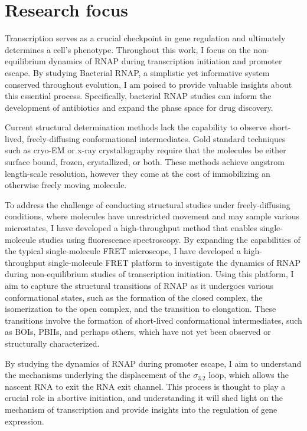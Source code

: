 \section{\label{sec:research_focus} Research focus}

Transcription serves as a crucial checkpoint in gene regulation and ultimately determines a cell's phenotype. 
Throughout this work, I focus on the non-equilibrium dynamics of RNAP during transcription initiation and promoter escape. 
By studying Bacterial RNAP, a simplistic yet informative system conserved throughout evolution, I am poised to provide valuable insights about this essential process. 
Specifically, bacterial RNAP studies can inform the development of antibiotics and expand the phase space for drug discovery. 

Current structural determination methods lack the capability to observe short-lived, freely-diffusing conformational intermediates. 
Gold standard techniques such as cryo-EM or x-ray crystallography require that the molecules be either surface bound, frozen, crystallized, or both. 
These methods achieve angstrom length-scale resolution, however they come at the cost of immobilizing an otherwise freely moving molecule. 

To address the challenge of conducting structural studies under freely-diffusing conditions, where molecules have unrestricted movement and may sample various microstates, I have developed a high-throughput method that enables single-molecule studies using fluorescence spectroscopy.
By expanding the capabilities of the typical single-molecule FRET microscope, I have developed a high-throughput single-molecule FRET platform to investigate the dynamics of RNAP during non-equilibrium studies of transcription initiation.
Using this platform, I aim to capture the structural transitions of RNAP as it undergoes various conformational states, such as the formation of the closed complex, the isomerization to the open complex, and the transition to elongation. 
These transitions involve the formation of short-lived conformational intermediates, such as \ac{BOIs}, \ac{PBIIs}, and perhaps others, which have not yet been observed or structurally characterized.

By studying the dynamics of RNAP during promoter escape, I aim to understand the mechanisms underlying the displacement of the $\sigma_{3.2}$ loop, which allows the nascent RNA to exit the RNA exit channel. 
This process is thought to play a crucial role in abortive initiation, and understanding it will shed light on the mechanism of transcription and provide insights into the regulation of gene expression.

